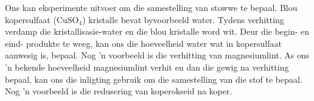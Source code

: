 Ons kan eksperimente uitvoer om die samestelling van stowwe te bepaal. Blou kopersulfaat ($\text{CuSO}_{4}$) kristalle bevat byvoorbeeld water. Tydens verhitting verdamp die kristallisasie-water en die blou kristalle word wit. Deur die begin- en eind- produkte te weeg, kan ons die hoeveelheid water wat in kopersulfaat aanwesig is, bepaal. Nog  'n voorbeeld is die verhitting van magnesiumlint. As ons  'n bekende hoeveelheid magnesiumlint verhit en dan die gewig na verhitting bepaal, kan ons die inligting gebruik om die samestelling van die stof te bepaal. Nog  'n voorbeeld is die redusering van koperokseid na koper.

    \noindent

